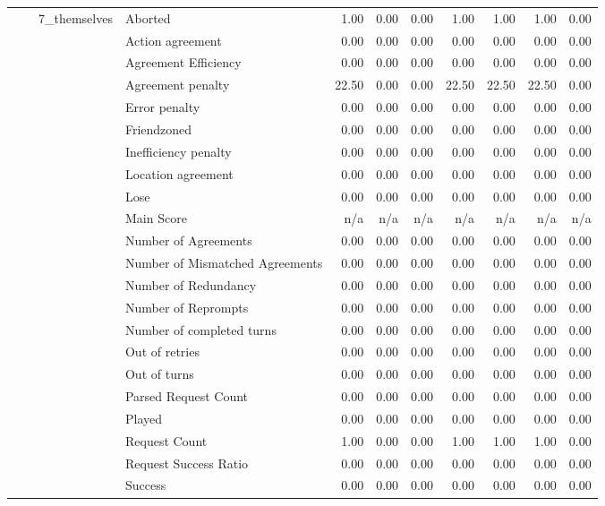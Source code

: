 \begin{tabular}{llllrrrrrrr}
 &  & \multirow[t]{27}{*}{7_themselves} & Aborted & 1.00 & 0.00 & 0.00 & 1.00 & 1.00 & 1.00 & 0.00 \\
 &  &  & Action agreement & 0.00 & 0.00 & 0.00 & 0.00 & 0.00 & 0.00 & 0.00 \\
 &  &  & Agreement Efficiency & 0.00 & 0.00 & 0.00 & 0.00 & 0.00 & 0.00 & 0.00 \\
 &  &  & Agreement penalty & 22.50 & 0.00 & 0.00 & 22.50 & 22.50 & 22.50 & 0.00 \\
 &  &  & Error penalty & 0.00 & 0.00 & 0.00 & 0.00 & 0.00 & 0.00 & 0.00 \\
 &  &  & Friendzoned & 0.00 & 0.00 & 0.00 & 0.00 & 0.00 & 0.00 & 0.00 \\
 &  &  & Inefficiency penalty & 0.00 & 0.00 & 0.00 & 0.00 & 0.00 & 0.00 & 0.00 \\
 &  &  & Location agreement & 0.00 & 0.00 & 0.00 & 0.00 & 0.00 & 0.00 & 0.00 \\
 &  &  & Lose & 0.00 & 0.00 & 0.00 & 0.00 & 0.00 & 0.00 & 0.00 \\
 &  &  & Main Score & n/a & n/a & n/a & n/a & n/a & n/a & n/a \\
 &  &  & Number of Agreements & 0.00 & 0.00 & 0.00 & 0.00 & 0.00 & 0.00 & 0.00 \\
 &  &  & Number of Mismatched Agreements & 0.00 & 0.00 & 0.00 & 0.00 & 0.00 & 0.00 & 0.00 \\
 &  &  & Number of Redundancy & 0.00 & 0.00 & 0.00 & 0.00 & 0.00 & 0.00 & 0.00 \\
 &  &  & Number of Reprompts & 0.00 & 0.00 & 0.00 & 0.00 & 0.00 & 0.00 & 0.00 \\
 &  &  & Number of completed turns & 0.00 & 0.00 & 0.00 & 0.00 & 0.00 & 0.00 & 0.00 \\
 &  &  & Out of retries & 0.00 & 0.00 & 0.00 & 0.00 & 0.00 & 0.00 & 0.00 \\
 &  &  & Out of turns & 0.00 & 0.00 & 0.00 & 0.00 & 0.00 & 0.00 & 0.00 \\
 &  &  & Parsed Request Count & 0.00 & 0.00 & 0.00 & 0.00 & 0.00 & 0.00 & 0.00 \\
 &  &  & Played & 0.00 & 0.00 & 0.00 & 0.00 & 0.00 & 0.00 & 0.00 \\
 &  &  & Request Count & 1.00 & 0.00 & 0.00 & 1.00 & 1.00 & 1.00 & 0.00 \\
 &  &  & Request Success Ratio & 0.00 & 0.00 & 0.00 & 0.00 & 0.00 & 0.00 & 0.00 \\
 &  &  & Success & 0.00 & 0.00 & 0.00 & 0.00 & 0.00 & 0.00 & 0.00 \\

\end{tabular}
